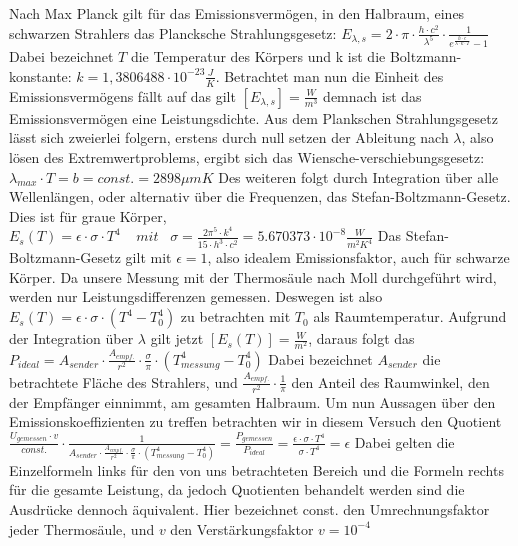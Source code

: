 \documentclass[a4paper, 11pt]{article}
\begin{document}
Nach Max Planck gilt für das Emissionsvermögen, in den Halbraum, eines schwarzen Strahlers das Plancksche Strahlungsgesetz:
\newline
$E_{\lambda,s}= 2 \cdot \pi \cdot \frac{h \cdot c^2}{\lambda^5} \cdot \frac{1}{e^{\frac{h\cdot c}{\lambda \cdot k \cdot T}}-1}$
\newline
Dabei bezeichnet $T$ die Temperatur des Körpers und k ist die Boltzmann-konstante: $k=1,3806488 \cdot 10^{-23}\frac{J}{K}$. Betrachtet man nun die Einheit des Emissionsvermögens fällt auf das gilt $[E_{\lambda,s}]=\frac{W}{m^3}$ demnach ist das Emissionsvermögen eine Leistungsdichte.
\newline
Aus dem Plankschen Strahlungsgesetz lässt sich zweierlei folgern, erstens durch null setzen der Ableitung nach $\lambda$, also lösen des Extremwertproblems, ergibt sich das Wiensche-verschiebungsgesetz:
\newline
$\lambda_{max} \cdot T=b=const.=2898 \mu m K$
\newline 
Des weiteren folgt durch Integration über alle Wellenlängen, oder alternativ über die Frequenzen, das Stefan-Boltzmann-Gesetz. Dies ist für graue Körper, 
\newline
$E_s(T)=\epsilon \cdot \sigma \cdot T^4 \; \; \; \; mit\; \; \;   \sigma = \frac{2 \pi^5 \cdot k^4}{15 \cdot h^3 \cdot c^2}= 5.670373 \cdot 10^{-8} \frac{W}{m^2K^4}$
\newline
\newline
Das Stefan-Boltzmann-Gesetz gilt mit $\epsilon=1$, also idealem Emissionsfaktor, auch für schwarze Körper.
Da unsere Messung mit der Thermosäule nach Moll durchgeführt wird, werden nur Leistungsdifferenzen gemessen. Deswegen ist also $E_s(T)=\epsilon \cdot \sigma \cdot( T^4-T_0^4) $ zu betrachten mit $T_0$ als Raumtemperatur.
\newline
Aufgrund der Integration über $\lambda$ gilt jetzt $[E_s(T)]=\frac{W}{m^2}$, daraus folgt das
\newline
$P_{ideal}= A_{sender}\cdot \frac{A_{empf.}}{r^2} \cdot \frac{\sigma}{\pi} \cdot (T_{messung}^4-T_0^4)$
\newline
Dabei bezeichnet $A_{sender}$ die betrachtete Fläche des Strahlers, und
\newline 
$\frac{A_{empf.}}{r^2} \cdot \frac{1}{\pi}$ den Anteil des Raumwinkel, den der Empfänger einnimmt, am gesamten Halbraum.
\newline
Um nun Aussagen über den Emissionskoeffizienten zu treffen betrachten wir in diesem Versuch den Quotient 
\newline
$ \frac{U_{gemessen} \cdot v}{const.}\cdot \frac{1}{A_{sender}\cdot \frac{A_{empf.}}{r^2} \cdot \frac{\sigma}{\pi} \cdot (T_{messung}^4-T_0^4)}=\frac{P_{gemessen}}{P_{ideal}}=\frac{\epsilon \cdot \sigma\cdot T^4}{\sigma \cdot T^4}=\epsilon$
\newline
Dabei gelten die Einzelformeln links für den von uns betrachteten Bereich und die Formeln rechts für die gesamte Leistung, da jedoch Quotienten behandelt werden sind die Ausdrücke dennoch äquivalent.
Hier bezeichnet const. den Umrechnungsfaktor jeder Thermosäule, und $v$ den Verstärkungsfaktor $v=10 ^{-4}$
\end{document}
